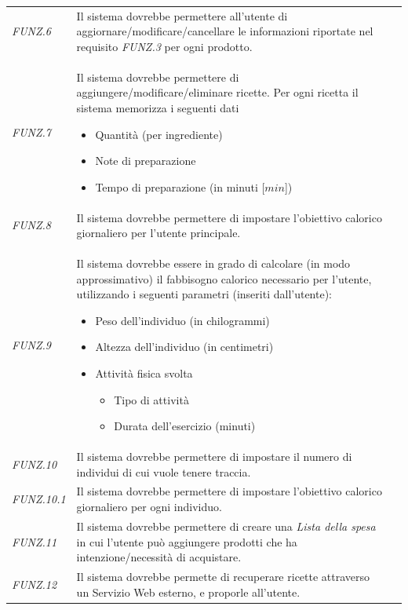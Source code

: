 \documentclass{article}
\newcommand{\must}{\cellcolor{Green}{M}}
\newcommand{\should}{\cellcolor{LimeGreen}{S}}
\newcommand{\could}{\cellcolor{RedOrange}{C}}
\newcommand{\wont}{\cellcolor{BrickRed}{W}}
\begin{document}
\begin{center}
\begin{longtable}{p{50pt}p{250pt}c}
         \textit{FUNZ.6} & Il sistema dovrebbe permettere all'utente di aggiornare/modificare/cancellare le informazioni riportate nel requisito \textit{FUNZ.3} per ogni prodotto. & \must \\
         \textit{FUNZ.7} & Il sistema dovrebbe permettere di aggiungere/modificare/eliminare ricette. Per ogni ricetta il sistema memorizza i seguenti dati
         \begin{itemize}
             \item Quantità (per ingrediente)
             \item Note di preparazione
             \item Tempo di preparazione (in minuti [$min$])
         \end{itemize}& \should \\
         \textit{FUNZ.8} & Il sistema dovrebbe permettere di impostare l'obiettivo calorico giornaliero per l'utente principale.  & \must \\
         \textit{FUNZ.9} & Il sistema dovrebbe essere in grado di calcolare (in modo approssimativo) il fabbisogno calorico necessario per l'utente, utilizzando i seguenti parametri (inseriti dall'utente): \begin{itemize}
             \item Peso dell'individuo (in chilogrammi)
             \item Altezza dell'individuo (in centimetri)
             \item Attività fisica svolta 
             \begin{itemize}
                 \item Tipo di attività 
                 \item Durata dell'esercizio (minuti)
             \end{itemize}
         \end{itemize}  & \wont \\
         \textit{FUNZ.10} & Il sistema dovrebbe permettere di impostare il numero di individui di cui vuole tenere traccia. & \could \\
         \textit{FUNZ.10.1} & Il sistema dovrebbe permettere di impostare l'obiettivo calorico giornaliero per ogni individuo.  & \could \\
         \textit{FUNZ.11} & Il sistema dovrebbe permettere di creare una \textit{Lista della spesa} in cui l'utente può aggiungere prodotti che ha intenzione/necessità di acquistare. & \could \\
         \textit{FUNZ.12} & Il sistema dovrebbe permette di recuperare ricette attraverso un Servizio Web esterno, e proporle all'utente. & \wont \\

\end{longtable}
\end{center}
\end{document}
